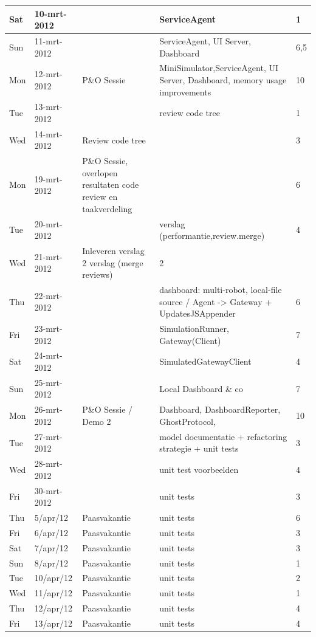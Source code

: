 \documentclass[12pt,a4paper]{report}
\begin{document}
\begin{landscape}
\begin{longtable}{llp{7cm}p{10cm}l}
\hline
Sat & 10-mrt-2012 &  & ServiceAgent & 1 \\ 
\hline
Sun & 11-mrt-2012 &  & ServiceAgent, UI Server, Dashboard & 6,5 \\ 
\hline
Mon & 12-mrt-2012 & P\&O Sessie & MiniSimulator,ServiceAgent, UI Server, Dashboard, memory usage improvements & 10 \\ 
\hline
Tue & 13-mrt-2012 &  & review code tree & 1 \\ 
\hline
Wed & 14-mrt-2012 & Review code tree  &  & 3 \\ 
\hline
Mon & 19-mrt-2012 & P\&O Sessie, overlopen resultaten code review en taakverdeling &  & 6 \\ 
\hline
Tue & 20-mrt-2012 &  & verslag (performantie,review.merge) & 4 \\ 
\hline
Wed & 21-mrt-2012 & Inleveren verslag 2 verslag (merge reviews) & 2 \\ 
\hline
Thu & 22-mrt-2012 &  & dashboard: multi-robot, local-file source / Agent -> Gateway + UpdatesJSAppender & 6 \\ 
\hline
Fri & 23-mrt-2012 &  & SimulationRunner, Gateway(Client) & 7 \\ 
\hline
Sat & 24-mrt-2012 &  & SimulatedGatewayClient & 4 \\ 
\hline
Sun & 25-mrt-2012 &  & Local Dashboard \& co & 7 \\ 
\hline
Mon & 26-mrt-2012 & P\&O Sessie / Demo 2 & Dashboard, DashboardReporter, GhostProtocol,  & 10 \\ 
\hline
Tue & 27-mrt-2012 &  & model documentatie + refactoring strategie + unit tests & 3 \\ 
\hline
Wed & 28-mrt-2012 &  & unit test voorbeelden & 4 \\ 
\hline
Fri & 30-mrt-2012 &  & unit tests & 3 \\ 
\hline
Thu & 5/apr/12 & Paasvakantie & unit tests & 6 \\ 
\hline
Fri & 6/apr/12 & Paasvakantie & unit tests & 3 \\ 
\hline
Sat & 7/apr/12 & Paasvakantie & unit tests & 3 \\ 
\hline
Sun & 8/apr/12 & Paasvakantie & unit tests & 1 \\ 
\hline
Tue & 10/apr/12 & Paasvakantie & unit tests & 2 \\ 
\hline
Wed & 11/apr/12 & Paasvakantie & unit tests & 1 \\ 
\hline
Thu & 12/apr/12 & Paasvakantie & unit tests & 4 \\ 
\hline
Fri & 13/apr/12 & Paasvakantie & unit tests & 4 \\ 

\end{longtable}
\end{landscape}
\end{document}
